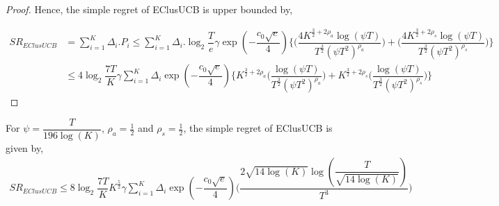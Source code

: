 \begin{proof}
Hence, the simple regret of EClusUCB is upper bounded by,

\begin{align*}
SR_{EClusUCB} &= \sum_{i=1}^{K} \Delta_{i}. P_{i} \leq \sum_{i=1}^{K} \Delta_{i}. \log_{2}\dfrac{T}{e}\gamma \exp(-\dfrac{c_{0}\sqrt{e}}{4})\bigg\lbrace\bigg(\dfrac{4K^{\frac{3}{2} +2\rho_{a}}\log (\psi T )}{T^{\frac{3}{2}}(\psi T^2)^{\rho_{a}}}\bigg) + \bigg(\dfrac{4K^{\frac{3}{2} +2\rho_{s}}\log (\psi T )}{T^{\frac{3}{2}}(\psi T^2)^{\rho_{s}}}\bigg)\bigg\rbrace \\
&\leq 4\log_{2}\dfrac{7T}{K}\gamma \sum_{i=1}^{K} \Delta_{i} \exp(-\dfrac{c_{0}\sqrt{e}}{4}) \bigg\lbrace K^{\frac{3}{2} +2\rho_{a}} \bigg(\dfrac{\log (\psi T )}{T^{\frac{3}{2}}(\psi T^2)^{\rho_{a}}}\bigg) + K^{\frac{3}{2} +2\rho_{s}} \bigg(\dfrac{\log (\psi T )}{T^{\frac{3}{2}}(\psi T^2)^{\rho_{s}}}\bigg) \bigg\rbrace
\end{align*}

\end{proof}


\begin{corollary}
\label{Result:Corollary:3}
For $\psi=\dfrac{T}{196\log (K)}$, $\rho_a=\frac{1}{2}$ and $\rho_s=\frac{1}{2}$, the simple regret of EClusUCB is given by,
\begin{align*}
SR_{EClusUCB} \leq 8 \log_{2}\dfrac{7T}{K} K^{\frac{5}{2}} \gamma \sum_{i=1}^{K} \Delta_{i} \exp(-\dfrac{c_{0}\sqrt{e}}{4})   \bigg(\dfrac{2 \sqrt{14\log (K)} \log (\dfrac{T}{\sqrt{14\log (K)}} )}{T^{3}}\bigg)
\end{align*}
\end{corollary}

